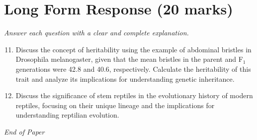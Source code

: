 \documentclass[12pt]{article}
\begin{document}
\section*{Long Form Response (20 marks)}
\textit{Answer each question with a clear and complete explanation.}
\begin{enumerate}[label=\arabic*.]
\setcounter{enumi}{10}
\item Discuss the concept of heritability using the example of abdominal bristles in Drosophila melanogaster, given that the mean bristles in the parent and F$_{1}$ generations were 42.8 and 40.6, respectively. Calculate the heritability of this trait and analyze its implications for understanding genetic inheritance.
\item Discuss the significance of stem reptiles in the evolutionary history of modern reptiles, focusing on their unique lineage and the implications for understanding reptilian evolution.
\end{enumerate}

\vfill
\noindent\textit{End of Paper}
\end{document}
